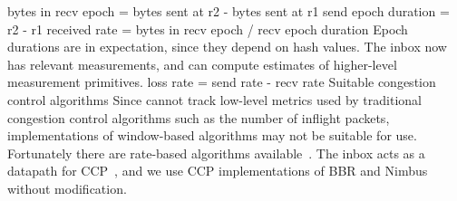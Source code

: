 \begin{outline}
            \4 bytes in recv epoch = bytes sent at r2 - bytes sent at r1
            \4 send epoch duration = r2 - r1
            \4 received rate = bytes in recv epoch / recv epoch duration
        \3 Epoch durations are in expectation, since they depend on hash values.
    \2 The inbox now has relevant measurements, and can compute estimates of higher-level measurement primitives.
        \3 \eg loss rate = send rate - recv rate
\1 Suitable congestion control algorithms
    \2 Since \name cannot track low-level metrics used by traditional congestion control algorithms such as the number of inflight packets, implementations of window-based algorithms may not be suitable for use.
    \2 Fortunately there are rate-based algorithms available~\cite{bbr, nimbus}.
    \2 The inbox acts as a datapath for CCP~\cite{ccp}, and we use CCP implementations of BBR and Nimbus without modification.
\end{outline}